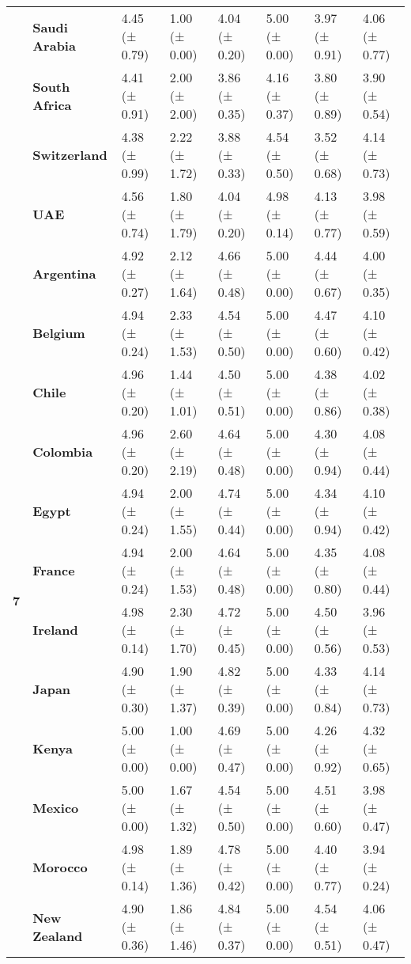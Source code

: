 \begin{tabular}{llllllll}
\textbf{} & \textbf{Saudi Arabia} & 4.45 (± 0.79) & 1.00 (± 0.00) & 4.04 (± 0.20) & 5.00 (± 0.00) & 3.97 (± 0.91) & 4.06 (± 0.77) \\
\textbf{} & \textbf{South Africa} & 4.41 (± 0.91) & 2.00 (± 2.00) & 3.86 (± 0.35) & 4.16 (± 0.37) & 3.80 (± 0.89) & 3.90 (± 0.54) \\
\textbf{} & \textbf{Switzerland} & 4.38 (± 0.99) & 2.22 (± 1.72) & 3.88 (± 0.33) & 4.54 (± 0.50) & 3.52 (± 0.68) & 4.14 (± 0.73) \\
\textbf{} & \textbf{UAE} & 4.56 (± 0.74) & 1.80 (± 1.79) & 4.04 (± 0.20) & 4.98 (± 0.14) & 4.13 (± 0.77) & 3.98 (± 0.59) \\
\cline{1-8}
\multirow[t]{19}{*}{\textbf{7}} & \textbf{Argentina} & 4.92 (± 0.27) & 2.12 (± 1.64) & 4.66 (± 0.48) & 5.00 (± 0.00) & 4.44 (± 0.67) & 4.00 (± 0.35) \\
\textbf{} & \textbf{Belgium} & 4.94 (± 0.24) & 2.33 (± 1.53) & 4.54 (± 0.50) & 5.00 (± 0.00) & 4.47 (± 0.60) & 4.10 (± 0.42) \\
\textbf{} & \textbf{Chile} & 4.96 (± 0.20) & 1.44 (± 1.01) & 4.50 (± 0.51) & 5.00 (± 0.00) & 4.38 (± 0.86) & 4.02 (± 0.38) \\
\textbf{} & \textbf{Colombia} & 4.96 (± 0.20) & 2.60 (± 2.19) & 4.64 (± 0.48) & 5.00 (± 0.00) & 4.30 (± 0.94) & 4.08 (± 0.44) \\
\textbf{} & \textbf{Egypt} & 4.94 (± 0.24) & 2.00 (± 1.55) & 4.74 (± 0.44) & 5.00 (± 0.00) & 4.34 (± 0.94) & 4.10 (± 0.42) \\
\textbf{} & \textbf{France} & 4.94 (± 0.24) & 2.00 (± 1.53) & 4.64 (± 0.48) & 5.00 (± 0.00) & 4.35 (± 0.80) & 4.08 (± 0.44) \\
\textbf{} & \textbf{Ireland} & 4.98 (± 0.14) & 2.30 (± 1.70) & 4.72 (± 0.45) & 5.00 (± 0.00) & 4.50 (± 0.56) & 3.96 (± 0.53) \\
\textbf{} & \textbf{Japan} & 4.90 (± 0.30) & 1.90 (± 1.37) & 4.82 (± 0.39) & 5.00 (± 0.00) & 4.33 (± 0.84) & 4.14 (± 0.73) \\
\textbf{} & \textbf{Kenya} & 5.00 (± 0.00) & 1.00 (± 0.00) & 4.69 (± 0.47) & 5.00 (± 0.00) & 4.26 (± 0.92) & 4.32 (± 0.65) \\
\textbf{} & \textbf{Mexico} & 5.00 (± 0.00) & 1.67 (± 1.32) & 4.54 (± 0.50) & 5.00 (± 0.00) & 4.51 (± 0.60) & 3.98 (± 0.47) \\
\textbf{} & \textbf{Morocco} & 4.98 (± 0.14) & 1.89 (± 1.36) & 4.78 (± 0.42) & 5.00 (± 0.00) & 4.40 (± 0.77) & 3.94 (± 0.24) \\
\textbf{} & \textbf{New Zealand} & 4.90 (± 0.36) & 1.86 (± 1.46) & 4.84 (± 0.37) & 5.00 (± 0.00) & 4.54 (± 0.51) & 4.06 (± 0.47) \\

\end{tabular}
